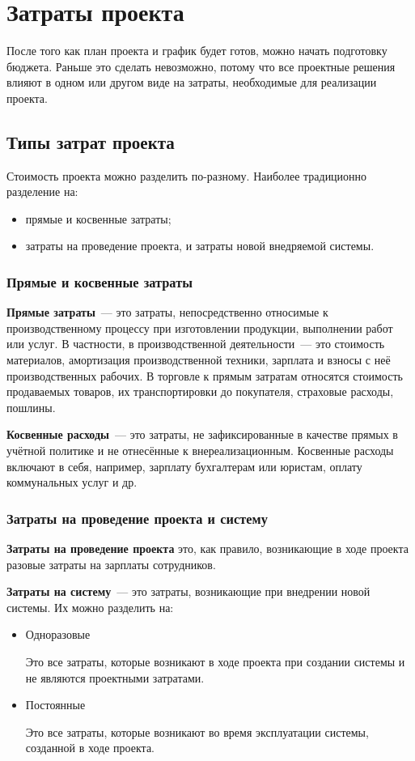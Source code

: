 \chapter{Затраты проекта}

После того как план проекта и график будет готов, можно начать подготовку бюджета. 
Раньше это сделать невозможно, потому что все проектные решения влияют в одном или другом  виде на затраты, необходимые для реализации проекта.

\section{Типы затрат проекта}
Стоимость проекта можно разделить по-разному. Наиболее традиционно разделение на:
\begin{itemize}
	\item прямые и косвенные затраты;
	\item затраты на проведение проекта, и затраты новой внедряемой системы. 
\end{itemize}

\subsection{Прямые и косвенные затраты}
\textbf{Прямые затраты}~--- это затраты, непосредственно относимые к производственному процессу при изготовлении продукции, выполнении работ или услуг. 
В частности, в производственной деятельности~--- это стоимость материалов, амортизация производственной техники, зарплата и взносы с неё производственных рабочих. 
В торговле к прямым затратам относятся стоимость продаваемых товаров, их транспортировки до покупателя, страховые расходы, пошлины.

\textbf{Косвенные расходы}~--- это затраты, не зафиксированные в качестве прямых в учётной политике и не отнесённые к внереализационным.
Косвенные расходы включают в себя, например, зарплату бухгалтерам или юристам, оплату коммунальных услуг и др.

\subsection{Затраты на проведение проекта и систему}
\textbf{Затраты на проведение проекта} это, как правило, возникающие в ходе проекта разовые затраты на зарплаты сотрудников.

\textbf{Затраты на систему}~--- это затраты, возникающие при внедрении новой системы. 
Их можно разделить на:
\begin{itemize}
	\item Одноразовые
	
	Это все затраты, которые возникают в ходе проекта при создании системы и не являются проектными затратами.
	\item Постоянные
	
	Это все затраты, которые возникают во время эксплуатации системы, созданной в ходе проекта.
\end{itemize}

